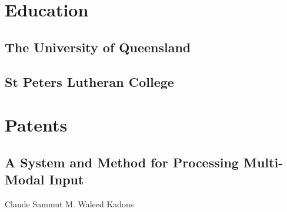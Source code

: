 \documentclass[a4paper]{awesome-deedy}
\begin{document}
\begin{minipage}[t]{0.33\textwidth} 


\section{Education} 

\subsection{The University of \newline Queensland}
\sectionsep

\subsection{St Peters Lutheran College}
\sectionsep


\section{Patents} 

\subsection{A System and Method for \newline Processing Multi-Modal \newline Input}
Claude Sammut \textbullet{} M. Waleed Kadous
\sectionsep




\end{minipage}
\end{document}

